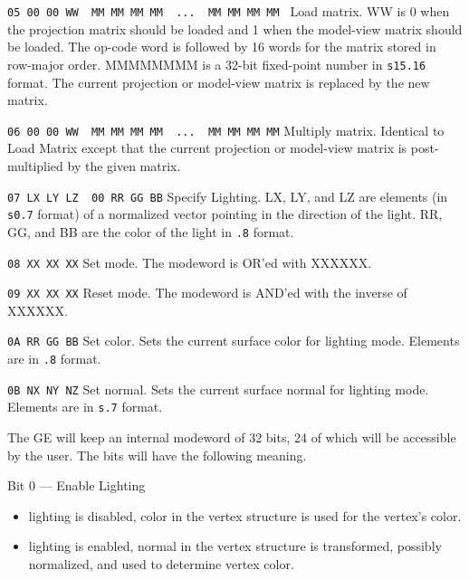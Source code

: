 \documentclass{book}
\begin{document}
\begin{indented}{\tt 05 00 00 WW \ MM MM MM MM \ ... \ MM MM MM MM  }
Load matrix.  WW is 0 when the projection matrix should be loaded and
1 when the model-view matrix should be loaded.  The op-code word is
followed by 16 words for the matrix stored in row-major order.
MMMMMMMM is a 32-bit fixed-point number in {\tt s15.16} format.  The
current projection or model-view matrix is replaced by the new matrix.
\end{indented}

\begin{indented}{\tt 06 00 00 WW \ MM MM MM MM \ ... \ MM MM MM MM}
Multiply matrix.  Identical to Load Matrix except that the current
projection or model-view matrix is post-multiplied by the given
matrix.
\end{indented}

\begin{indented}{\tt 07 LX LY LZ \ 00 RR GG BB}
Specify Lighting.  LX, LY, and LZ are elements (in {\tt s0.7} format) of a
normalized vector pointing in the direction of the light.  RR, GG, and BB are
the color of the light in {\tt .8} format.
\end{indented}

\begin{indented}{\tt 08 XX XX XX}
Set mode.  The modeword is OR'ed with XXXXXX.
\end{indented}

\begin{indented}{\tt 09 XX XX XX}
Reset mode.  The modeword is AND'ed with the inverse of XXXXXX.
\end{indented}

\begin{indented}{\tt 0A RR GG BB}
Set color.  Sets the current surface color for lighting mode.  Elements
are in {\tt .8} format.
\end{indented}

\begin{indented}{\tt 0B NX NY NZ}
Set normal.  Sets the current surface normal for lighting mode.  Elements
are in {\tt s.7} format.
\end{indented}


The GE will keep an internal modeword of 32 bits, 24 of which will
be accessible by the user.  The bits will have the following meaning.

\begin{indented}{\sc Bit 0 --- Enable Lighting}
  \begin{itemize}
     \item[If 0] lighting is disabled, color in the vertex
       structure is used for the vertex's color.
     \item[If 1] lighting is enabled, normal in the vertex structure is
       transformed, possibly normalized, and used to determine vertex color.
  \end{itemize}
\end{indented}
\end{document}
